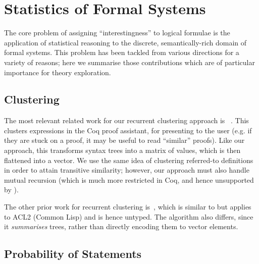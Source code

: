 \section{Statistics of Formal Systems}

\iffalse
TODO: Alison: I'd like to revisit this chapter once I see the whole
thesis. At the moment it feels in parts more like a discussion of your work,
than of related work. It might help to read other people's related work sections
to get a better idea of what to include here. I think it'll be more obvious too,
once we have the intro, etc. I suspect you'll need to do a fair bit more work on
this one.
\fi

The core problem of assigning ``interestingness'' to logical formulae is the
application of statistical reasoning to the discrete, semantically-rich domain
of formal systems. This problem has been tackled from various directions for a
variety of reasons; here we summarise those contributions which are of
particular importance for theory exploration.

\subsection{Clustering}
\label{sec:clustering}

The most relevant related work for our recurrent clustering approach is
\mlforpg{}~\cite{journals/corr/abs-1212-3618}. This clusters expressions in the
Coq proof assistant, for presenting to the user (e.g. if they are stuck on a
proof, it may be useful to read ``similar'' proofs). Like our approach, this
transforms syntax trees into a matrix of values, which is then flattened into a
vector. We use the same idea of clustering referred-to definitions in order to
attain transitive similarity; however, our approach must also handle mutual
recursion (which is much more restricted in Coq, and hence unsupported by
\mlforpg{}).

The other prior work for recurrent clustering is\aclml{}~\cite{heras2013proof},
which is similar to \mlforpg{} but applies to ACL2 (Common Lisp) and is hence
untyped. The algorithm also differs, since it \emph{summarises} trees, rather
than directly encoding them to vector elements.

\subsection{Probability of Statements}


